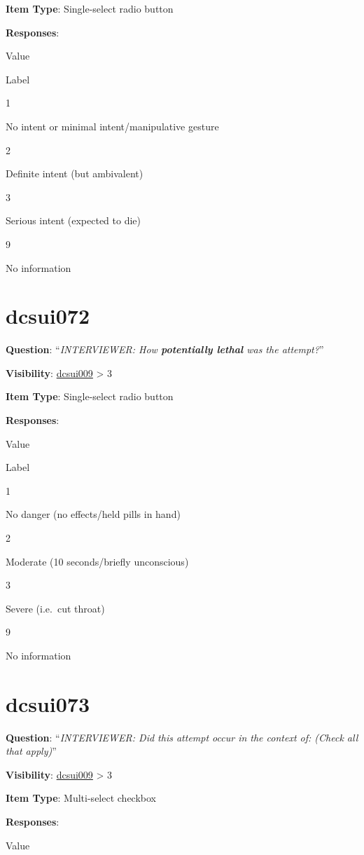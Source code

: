 \documentclass[]{book}
\begin{document}
\textbf{Item Type}: Single-select radio button

\textbf{Responses}:

Value

Label

1

No intent or minimal intent/manipulative gesture

2

Definite intent (but ambivalent)

3

Serious intent (expected to die)

9

No information

\hypertarget{dcsui072}{%
\section{dcsui072}\label{dcsui072}}

\textbf{Question}: ``\emph{INTERVIEWER: How \textbf{potentially lethal} was the attempt?}''

\textbf{Visibility}: \protect\hyperlink{dcsui009}{dcsui009} \textgreater{} 3

\textbf{Item Type}: Single-select radio button

\textbf{Responses}:

Value

Label

1

No danger (no effects/held pills in hand)

2

Moderate (10 seconds/briefly unconscious)

3

Severe (i.e.~cut throat)

9

No information

\hypertarget{dcsui073}{%
\section{dcsui073}\label{dcsui073}}

\textbf{Question}: ``\emph{INTERVIEWER: Did this attempt occur in the context of: (Check all that apply)}''

\textbf{Visibility}: \protect\hyperlink{dcsui009}{dcsui009} \textgreater{} 3

\textbf{Item Type}: Multi-select checkbox

\textbf{Responses}:

Value
\end{document}
